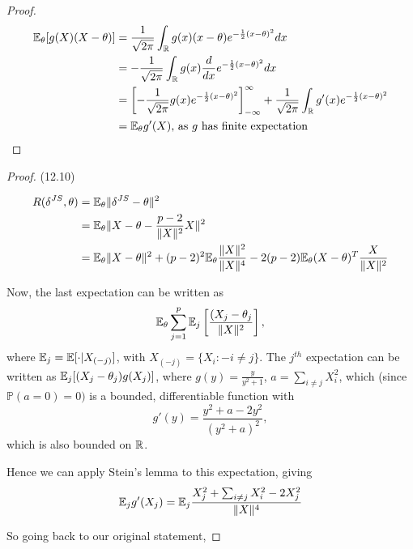 \documentclass[a4paper]{article}
\begin{document}
\begin{proof}
	\begin{align*}
		\mathbb{E}_{\theta} [g(X)(X-\theta)] &= \frac{1}{\sqrt{2\pi} } \int_{\mathbb{R}} g(x)(x-\theta) e^{-\frac{1}{2} (x-\theta)^2} dx\\
			&= -\frac{1}{\sqrt{2\pi} } \int_{\mathbb{R}} g(x) \frac{d}{dx} e^{- \frac{1}{2} (x-\theta)^2} dx \\
			&= \left[ -\frac{1}{\sqrt{2\pi} } g(x) e^{- \frac{1}{2} (x-\theta)^2} \right]_{-\infty}^{\infty} + \frac{1}{\sqrt{2\pi} } \int_{\mathbb{R}} g'(x) e^{- \frac{1}{2} (x-\theta)^2}\\
			&= \mathbb{E}_{\theta} g'(X) \text{, as $g$ has finite expectation} 
	\end{align*}
\end{proof}

\begin{proof} (12.10)

\begin{align*}
	R(\delta^{JS}, \theta) &= \mathbb{E}_{\theta} \|\delta^{JS} - \theta\|^2 \\
	&= \mathbb{E}_{\theta} \|X - \theta - \frac{p-2}{\|X\|^2}X\|^2 \\
	&= \mathbb{E}_{\theta} \|X-\theta\|^2 + (p-2)^2\mathbb{E}_{\theta}\frac{\|X\|^2}{\|X\|^{4}} - 2(p-2) \mathbb{E}_{\theta} (X-\theta)^{T}\frac{X}{\|X\|^2}
\end{align*}

Now, the last expectation can be written as
\[
	\mathbb{E}_{\theta} \sum_{j=1}^{p} \mathbb{E}_{j} \left[ \frac{(X_j - \theta_j}{\|X\|^2} \right] 
,\]
where $\mathbb{E}_j = \mathbb{E} [\cdot | X_{(-j)}]$, with $X_{(-j)} = \{X_i : -i \neq j\} $. The $j ^{th}$ expectation can be written as $\mathbb{E}_j [(X_j - \theta_j) g(X_j)]$, where $g(y) = \frac{y}{y^2+1}$, $a = \sum_{i\neq j} X_i^2$, which (since $\mathbb{P}\left( a=0 \right) =0)$ is a bounded, differentiable function with 
\[
	g'(y) = \frac{y^2+a-2y^2}{(y^2+a)^2}
,\] which is also bounded on $\mathbb{R}$.

Hence we can apply Stein's lemma to this expectation, giving
\begin{align*}
	\mathbb{E}_j g'(X_j) &= \mathbb{E}_j \frac{X_j^2 + \sum_{i\neq j}X_i^2 - 2X_j^2}{\|X\|^4} \\
\end{align*}

So going back to our original statement,


\end{proof}
\end{document}
